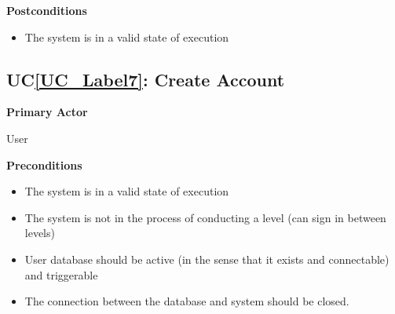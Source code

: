 \documentclass[12pt]{article}
\newcounter{ucnum} %
\newcommand{\ucref}[1]{UC\ref{#1}}
\begin{document}
\textbf{Postconditions}
\begin{itemize}
\item The system is in a valid state of execution
\end{itemize}




 \label{UC_Label7}
\subsection{\ucref{UC_Label7}: Create Account}

\textbf{Primary Actor}

User

\textbf{Preconditions}
\begin{itemize}
\item The system is in a valid state of execution
\item The system is not in the process of conducting a level (can sign in between levels)
\item User database should be active (in the sense that it exists and connectable) and triggerable
\item The connection between the database and system should be closed.
\end{itemize}
\end{document}
